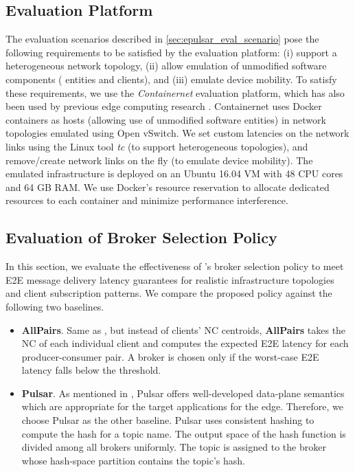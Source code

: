 \subsection{Evaluation Platform}
The evaluation scenarios described in \cref{sec:epulsar_eval_scenario} pose the following requirements to be satisfied by the evaluation platform: (i) support a heterogeneous network topology, (ii) allow emulation of unmodified software components (\epulsar{} entities and clients), and (iii) emulate device mobility. To satisfy these requirements, we use the \textit{Containernet} \cite{containernet} evaluation platform, which has also been used by previous edge computing research \cite{rothenberg2020intent,fiandrino2019openleon}. Containernet uses Docker containers as hosts (allowing use of unmodified software entities) in network topologies emulated using Open vSwitch. %
We set custom latencies on the network links using the Linux tool \emph{tc} (to support heterogeneous topologies), and remove/create network links on the fly (to emulate device mobility). 
The emulated infrastructure is deployed on an Ubuntu 16.04 VM with 48 CPU cores and 64 GB RAM. We use Docker's resource reservation to allocate dedicated resources to each container and minimize performance interference.


\subsection{Evaluation of Broker Selection Policy}
In this section, we evaluate the effectiveness of \epulsar{}'s broker selection policy to meet E2E message delivery latency guarantees for realistic infrastructure topologies and client subscription patterns. We compare the proposed policy against the following two baselines.
\begin{itemize}
\item \textbf{AllPairs}. Same as \epulsar, but instead of clients' NC  centroids, \textbf{AllPairs} takes the NC of each individual client and computes the expected E2E latency for each producer-consumer pair. A broker is chosen only if the worst-case E2E latency falls below the threshold.
\item \textbf{Pulsar}. As mentioned in , Pulsar offers well-developed data-plane semantics which are appropriate for the target applications for the edge. Therefore, we choose Pulsar as the other baseline. Pulsar uses consistent hashing to compute the hash for a topic name. The output space of the hash function is divided among all brokers uniformly. The topic is assigned to the broker whose hash-space partition contains the topic's hash.
\end{itemize}

